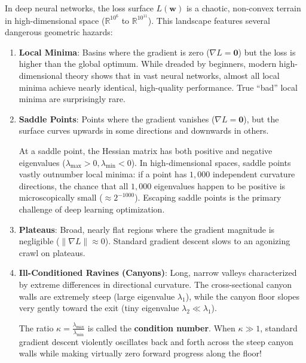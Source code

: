 In deep neural networks, the loss surface $L(\mathbf{w})$ is a chaotic, non-convex terrain in high-dimensional space ($\mathbb{R}^{10^6}$ to $\mathbb{R}^{10^{11}}$). This landscape features several dangerous geometric hazards:

\begin{enumerate}
    \item \textbf{Local Minima}: Basins where the gradient is zero ($\nabla L = \mathbf{0}$) but the loss is higher than the global optimum. While dreaded by beginners, modern high-dimensional theory shows that in vast neural networks, almost all local minima achieve nearly identical, high-quality performance. True ``bad'' local minima are surprisingly rare.
    
    \item \textbf{Saddle Points}: Points where the gradient vanishes ($\nabla L = \mathbf{0}$), but the surface curves upwards in some directions and downwards in others. 
    
    At a saddle point, the Hessian matrix has both positive and negative eigenvalues ($\lambda_{\max} > 0, \lambda_{\min} < 0$). In high-dimensional spaces, saddle points vastly outnumber local minima: if a point has $1{,}000$ independent curvature directions, the chance that all $1{,}000$ eigenvalues happen to be positive is microscopically small ($\approx 2^{-1000}$). Escaping saddle points is the primary challenge of deep learning optimization.

    \item \textbf{Plateaus}: Broad, nearly flat regions where the gradient magnitude is negligible ($\|\nabla L\| \approx 0$). Standard gradient descent slows to an agonizing crawl on plateaus.

    \item \textbf{Ill-Conditioned Ravines (Canyons)}: Long, narrow valleys characterized by extreme differences in directional curvature. The cross-sectional canyon walls are extremely steep (large eigenvalue $\lambda_1$), while the canyon floor slopes very gently toward the exit (tiny eigenvalue $\lambda_2 \ll \lambda_1$).
    
    The ratio $\kappa = \frac{\lambda_{\max}}{\lambda_{\min}}$ is called the \textbf{condition number}. When $\kappa \gg 1$, standard gradient descent violently oscillates back and forth across the steep canyon walls while making virtually zero forward progress along the floor!
\end{enumerate}

